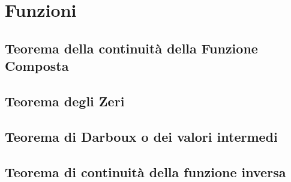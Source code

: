 \documentclass[11pt, a4paper]{book}
\begin{document}
\chapter{Funzioni}
\section{Teorema della continuità della Funzione Composta}
\section{Teorema degli Zeri}
\section{Teorema di Darboux o dei valori intermedi}
\section{Teorema di continuità della funzione inversa}
\end{document}
